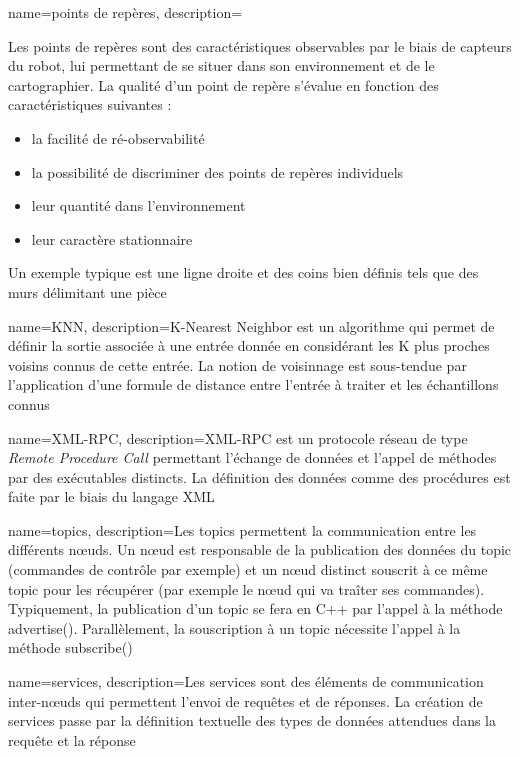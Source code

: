 {
  name={points de repères},
    description={Les points de repères sont des caractéristiques observables par le biais de capteurs du robot, lui permettant de se situer dans son environnement et de le cartographier. 
    La qualité d'un point de repère s'évalue en fonction des caractéristiques suivantes :
    \begin{itemize}
    \item la facilité de ré-observabilité
    \item la possibilité de discriminer des points de repères individuels 
    \item leur quantité dans l'environnement
    \item leur caractère stationnaire
    \end{itemize}
    Un exemple typique est une ligne droite et des coins bien définis tels que des murs délimitant une pièce}
}

{
  name={KNN},
    description={K-Nearest Neighbor est un algorithme qui permet de définir la sortie associée à une entrée donnée en considérant les K plus proches voisins connus de cette entrée. 
    La notion de voisinnage est sous-tendue par l'application d'une formule de distance entre l'entrée à traiter et les échantillons connus}
}

{
  name={XML-RPC},
    description={XML-RPC est un protocole réseau de type \emph{Remote Procedure Call} permettant l'échange de données et l'appel de méthodes par des exécutables distincts. La définition des données 
    comme des procédures est faite par le biais du langage \gls{XML}}
}

{
  name={topics},
    description={Les topics permettent la communication entre les différents n\oe{}uds. 
    Un n\oe{}ud est responsable de la publication des données du topic (commandes de contrôle par exemple) et un n\oe{}ud distinct souscrit à ce même topic pour les récupérer (par exemple le n\oe{}ud qui va traîter ses commandes).
    Typiquement, la publication d'un topic se fera en C++ par l'appel à la méthode advertise().
    Parallèlement, la souscription à un topic nécessite l'appel à la méthode subscribe()}
}

{
  name={services},
    description={Les services sont des éléments de communication inter-n\oe{}uds qui permettent l'envoi de requêtes et de réponses. 
    La création de services passe par la définition textuelle des types de données attendues dans la requête et la réponse}
}

